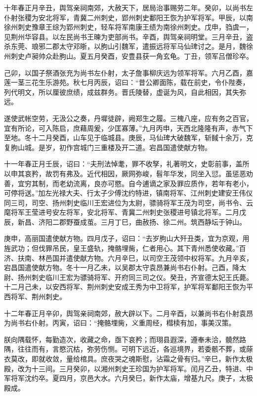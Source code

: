 \documentclass[12pt,UTF8]{ctexbook}
\begin{document}
十年春正月辛丑，舆驾亲祠南郊，大赦天下，居局治事赐劳二年。癸卯，以尚书左仆射张稷为安北将军，青冀二州刺史，郢州刺史鄱阳王恢为护军将军。甲辰，以南徐州刺史豫章王综为郢州刺史，轻车将军南康王绩为南徐州刺史。戊申，驺虞一，见荆州华容县。以左民尚书王暕为吏部尚书。辛酉，舆驾亲祠明堂。三月辛丑，盗杀东莞、琅邪二郡太守邓晣，以朐山引魏军，遣振远将军马仙琕讨之。是月，魏徐州刺史卢昶帅众赴朐山。夏五月癸酉，安豊县获一角玄龟。丁丑，领军吕僧珍卒。

己卯，以国子祭酒张充为尚书左仆射，太子詹事柳庆远为领军将军。六月乙酉，嘉莲一茎三花生乐游苑。秋七月丙辰，诏曰：“昔公卿面陈，载在前史，令仆陛奏，列代明文，所以厘彼庶绩，成兹群务。晋氏陵替，虚诞为风，自此相因，其失弥远。

遂使武帐空劳，无汲公之奏，丹墀徒辟，阙郑生之履。三槐八座，应有务之百官，宜有所论，可入陈启，庶藉周爰，少匡寡薄。”九月丙申，天西北隆隆有声，赤气下至地。冬十二月癸酉，山车见于临城县。庚辰，马仙琕大破魏军，斩馘十余万，克复朐山城。是岁，初作宫城门三重楼及开二道。宕昌国遣使献方物。

十一年春正月壬辰，诏曰：“夫刑法悼耄，罪不收孥，礼著明文，史彰前事，盖所以申其哀矜，故罚有弗及。近代相因，厥网弥峻，髫年华发，同坐入愆。虽惩恶劝善，宜穷其制，而老幼流离，良亦可愍。自今逋谪之家及罪应质作，若年有老小，可停将送。”加左光禄大夫、行太子少傅沈约特进，镇南将军、江州刺史建安王伟仪同三司，司空、扬州刺史临川王宏进位为太尉，骠骑将军王茂为司空，尚书令、云麾将军王莹进号安左将军，安北将军、青冀二州刺史张稷进号镇北将军。二月戊辰，新昌、济阳二郡野蚕成茧。三月丁巳，曲赦扬、徐二州。筑西静坛于钟山。

庚申，高丽国遣使献方物。四月戊子，诏曰：“去岁朐山大歼丑类，宜为京观，用旌武功；但伐罪吊民，皇王盛轨，掩骼埋胔，仁者用心。其下青州悉使收藏。”百济、扶南、林邑国并遣使献方物。六月辛巳，以司空王茂领中权将军。九月辛亥，宕昌国遣使献方物。冬十一月乙未，以吴郡太守袁昂兼尚书右仆射。己酉，降太尉、扬州刺史临川王宏为骠骑将军、开府同三司之仪。癸丑，齐宣德太妃王氏薨。十二月己未，以安西将军、荆州刺史安成王秀为中卫将军，护军将军鄱阳王恢为平西将军、荆州刺史。

十二年春正月辛卯，舆驾亲祠南郊，赦大辟以下。二月辛酉，以兼尚书右仆射袁昂为尚书右仆射。丙寅，诏曰：“掩骼埋胔，义重周经，槥椟有加，事美汉策。

朕向隅载怀，每勤造次，收藏之命，亟下哀矜；而珝县遐深，遵奉未洽，髐然路隅，往往而有，言愍沉枯，弥劳伤恻。可明下远近，各巡境界，若委骸不葬，或蒢衣莫改，即就收敛，量给棺具。庶夜哭之魂斯慰，沾霜之骨有归。”辛巳，新作太极殿，改为十三间。三月癸卯，以湘州刺史王珍国为护军将军。闰月乙丑，特进、中军将军沈约卒。夏四月，京邑大水。六月癸巳，新作太庙，增基九尺。庚子，太极殿成。
\end{document}
